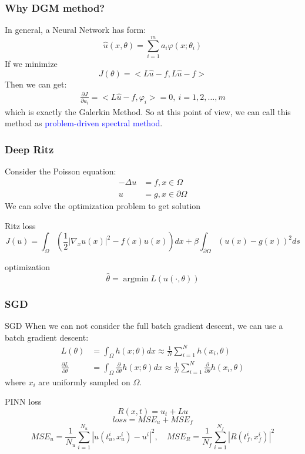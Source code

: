 \documentclass[8pt,aspectratio=15,mathserif]{beamer}
\begin{document}
\begin{frame}
\frametitle{Why DGM method?}
In general, a Neural Network has form:
$$
\hat{u}(x,\theta) = \sum_{i=1}^{m} a_i \varphi(x;\theta_i)
$$
If we minimize 
$$
J(\theta) = <L\hat{u}-f,L\hat{u}-f>
$$
Then we can get:
\begin{align*}
\frac{\partial J}{\partial a_i} = <L\hat{u}-f,\varphi_i> = 0, \ i=1,2,\ldots,m
\end{align*}
which is exactly the Galerkin Method. So at this point of view, we can call this method as \textcolor{blue}{problem-driven spectral method}.
\end{frame}
\begin{frame}
\frametitle{Deep Ritz\cite{DeepRitz}}
Consider the Poisson equation:
\begin{align*}
-\Delta u&=f, x \in \Omega \\{}
u &=g,x \in \partial \Omega
\end{align*}
We can solve the optimization problem to get solution
\begin{block}{Ritz loss}
$$
J(u)=\int_{\Omega}\left(\frac{1}{2}\left|\nabla_{x} u(x)\right|^{2}-f(x) u(x)\right) d x+\beta \int_{\partial \Omega} (u(x)-g(x))^{2} d s
$$
\end{block}
\begin{block}{optimization}
$$
\hat{\theta} = \mathop{argmin} L(u(\cdot,\theta))
$$
\end{block}
\end{frame}

\begin{frame}
\frametitle{SGD}

\begin{block}{SGD}
When we can not consider the full batch gradient descent, we can use a batch gradient descent:
\begin{align*}
L(\theta) &= \int_{\Omega} h(x;\theta) dx \approx \frac{1}{N}\sum_{i=1}^{N}h(x_i,\theta)\\
\frac{\partial L}{\partial \theta} &= \int_{\Omega} \frac{\partial }{\partial \theta} h(x;\theta)dx \approx \frac{1}{N}\sum_{i=1}^{N} \frac{\partial }{\partial \theta}h(x_i,\theta)
\end{align*}
where $x_i$ are uniformly sampled on $\Omega$.
\end{block}

\begin{block}{PINN loss\cite{PINN}}
$$
R(x,t) = u_t + Lu
$$
$$
loss = MSE_u + MSE_f
$$
$$
M S E_{u}=\frac{1}{N_{u}} \sum_{i=1}^{N_{u}}\left|u\left(t_{u}^{i}, x_{u}^{i}\right)-u^{i}\right|^{2}, \quad M S E_{R}=\frac{1}{N_{f}} \sum_{i=1}^{N_{f}}\left|R\left(t_{f}^{i}, x_{f}^{i}\right)\right|^{2}
$$
\end{block}

\end{frame}
\end{document}
